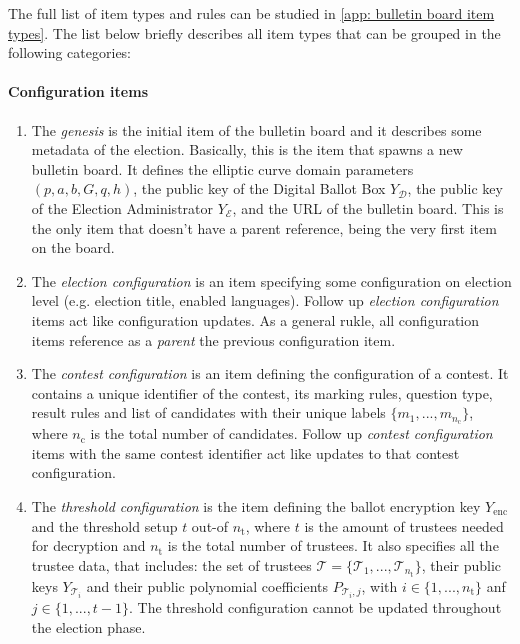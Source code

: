 The full list of item types and rules can be studied in \cref{app: bulletin board item types}. The list below briefly describes all item types that can be grouped in the following categories:

\paragraph{Configuration items}
\begin{enumerate}
    \item The \textit{genesis} is the initial item of the bulletin board and it describes some metadata of the election. Basically, this is the item that spawns a new bulletin board. It defines the elliptic curve domain parameters $(p, a, b, G, q, h)$, the public key of the Digital Ballot Box $Y_\mathcal{D}$, the public key of the Election Administrator $Y_\mathcal{E}$, and the URL of the bulletin board. This is the only item that doesn't have a parent reference, being the very first item on the board.
    
    \item The \textit{election configuration} is an item specifying some configuration on election level (e.g. election title, enabled languages). Follow up \textit{election configuration} items act like configuration updates. As a general rukle, all configuration items reference as a \textit{parent} the previous configuration item. 
    
    \item The \textit{contest configuration} is an item defining the configuration of a contest. It contains a unique identifier of the contest, its marking rules, question type, result rules and list of candidates with their unique labels $\{m_1, ..., m_{n_\mathrm{c}}\}$, where $n_\mathrm{c}$ is the total number of candidates. Follow up \textit{contest configuration} items with the same contest identifier act like updates to that contest configuration.
    
    \item The \textit{threshold configuration} is the item defining the ballot encryption key $Y_\mathrm{enc}$ and the threshold setup $t$ out-of $n_\mathrm{t}$, where $t$ is the amount of trustees needed for decryption and $n_\mathrm{t}$ is the total number of trustees. It also specifies all the trustee data, that includes: the set of trustees $\boldsymbol{\mathcal{T}} = \{\mathcal{T}_1, ..., \mathcal{T}_{n_\mathrm{t}}\}$, their public keys $Y_{\mathcal{T}_i}$ and their public polynomial coefficients $P_{\mathcal{T}_i,j}$, with $i \in \{1, ..., n_\mathrm{t}\}$ anf $j \in \{1, ..., t-1\}$. The threshold configuration cannot be updated throughout the election phase.
    

\end{enumerate}
